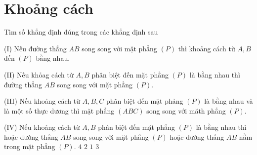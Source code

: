 \section{Khoảng cách}
\begin{ex}%
	Tìm số khẳng định đúng trong các khẳng định sau
	
	
	(I) Nếu đường thẳng $AB$ song song với mặt phẳng $(P)$ thì khoảng cách từ $A,B$ đến $(P)$ bằng nhau.
	
	(II) Nếu khỏag cách từ $A,B$ phân biệt đến mặt phẳng $(P)$ là bằng nhau thì đường thẳng $AB$ song song với mặt phẳng $(P)$.
	
	(III) Nếu khoảng cách từ $A,B,C$ phân biệt đến mặt phảng $(P)$ là bằng nhau và là một số thực dương thì mặt phẳng $(ABC)$ song song với măth phẳng $(P)$.
	
	(IV) Nếu khoảng cách từ $A,B$ phân biệt đến mặt phẳng $(P)$ là bằng nhau thì hoặc đường thẳng $AB$ song song với mặt phẳng $(P)$ hoặc đường thẳng $AB$ nằm trong mặt phẳng $(P)$.
	\choice
	{$4$}
	{$2$}
	{\True $1$}
	{$3$}
\end{ex}
